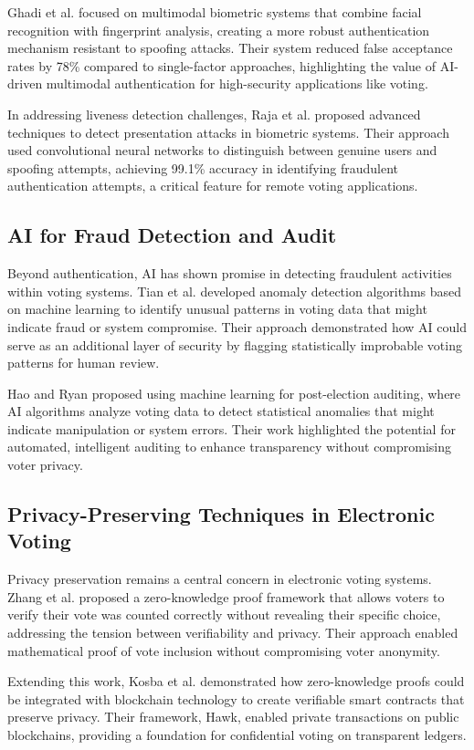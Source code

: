 \documentclass[conference]{IEEEtran}
\begin{document}
Ghadi et al. \cite{b12} focused on multimodal biometric systems that combine facial recognition with fingerprint analysis, creating a more robust authentication mechanism resistant to spoofing attacks. Their system reduced false acceptance rates by 78\% compared to single-factor approaches, highlighting the value of AI-driven multimodal authentication for high-security applications like voting.

In addressing liveness detection challenges, Raja et al. \cite{b13} proposed advanced techniques to detect presentation attacks in biometric systems. Their approach used convolutional neural networks to distinguish between genuine users and spoofing attempts, achieving 99.1\% accuracy in identifying fraudulent authentication attempts, a critical feature for remote voting applications.

\subsection{AI for Fraud Detection and Audit}
Beyond authentication, AI has shown promise in detecting fraudulent activities within voting systems. Tian et al. \cite{b14} developed anomaly detection algorithms based on machine learning to identify unusual patterns in voting data that might indicate fraud or system compromise. Their approach demonstrated how AI could serve as an additional layer of security by flagging statistically improbable voting patterns for human review.

Hao and Ryan \cite{b15} proposed using machine learning for post-election auditing, where AI algorithms analyze voting data to detect statistical anomalies that might indicate manipulation or system errors. Their work highlighted the potential for automated, intelligent auditing to enhance transparency without compromising voter privacy.

\subsection{Privacy-Preserving Techniques in Electronic Voting}
Privacy preservation remains a central concern in electronic voting systems. Zhang et al. \cite{b16} proposed a zero-knowledge proof framework that allows voters to verify their vote was counted correctly without revealing their specific choice, addressing the tension between verifiability and privacy. Their approach enabled mathematical proof of vote inclusion without compromising voter anonymity.

Extending this work, Kosba et al. \cite{b17} demonstrated how zero-knowledge proofs could be integrated with blockchain technology to create verifiable smart contracts that preserve privacy. Their framework, Hawk, enabled private transactions on public blockchains, providing a foundation for confidential voting on transparent ledgers.
\end{document}
